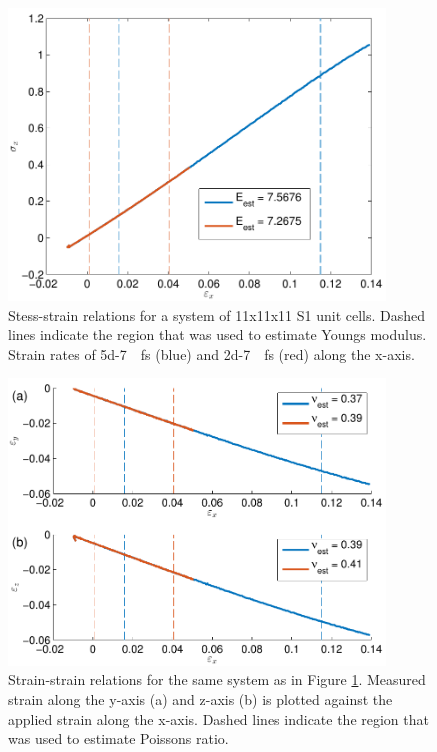 \begin{figure}
\centering
\includegraphics[width=10cm]{../figures/thesis/stress_strain_11_11_11_tip4p_ice_uam.pdf}
\caption{Stess-strain relations for a system of 11x11x11 S1 unit cells. Dashed lines indicate the region that was used to estimate Youngs modulus. Strain rates of \SI{5d-7}{\per\femto\second} (blue) and \SI{2d-7}{\per\femto\second} (red) along the x-axis.}
\label{fig:stress_strain_11_11_11_tip4p_ice_uam}

\end{figure}

\begin{figure}
\centering
\includegraphics[width=10cm]{../figures/thesis/strain_strain_11_11_11_y_z_poisson_tip4p_ice_uam.pdf}
\caption{Strain-strain relations for the same system as in Figure \ref{fig:stress_strain_11_11_11_tip4p_ice_uam}. Measured strain along the y-axis (a) and z-axis (b) is plotted against the applied strain along the x-axis. Dashed lines indicate the region that was used to estimate Poissons ratio.}
\label{fig:strain_strain_11_11_11_y_z_poisson_tip4p_ice_uam}

\end{figure}

